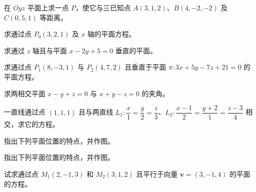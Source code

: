\noindent\begin{minipage}{\textwidth}
在 $Oyz$ 平面上求一点 $P$，使它与三已知点 $A(3,1,2)$、$B(4,-2,-2)$ 及 $C(0,5,1)$ 等距离。
\end{minipage}\par\vfill
\newpage
\noindent\begin{minipage}{\textwidth}
求通过点 $P_0(3,2,1)$ 及 $x$ 轴的平面方程。
\end{minipage}\par\vfill
\noindent\begin{minipage}{\textwidth}
求通过 $z$ 轴且与平面 $x-2y+5=0$ 垂直的平面。
\end{minipage}\par\vfill
\noindent\begin{minipage}{\textwidth}
求通过点 $P_1(8,-3,1)$ 与 $P_2(4,7,2)$ 且垂直于平面 $\pi:3x+5y-7z+21=0$ 的平面方程。
\end{minipage}\par\vfill
\noindent\begin{minipage}{\textwidth}
求两相交平面 $x-y+z=0$ 与 $x+y-z=0$ 的夹角。
\end{minipage}\par\vfill
\newpage
\noindent\begin{minipage}{\textwidth}
一直线通过点 $(1,1,1)$ 且与两直线 $L_1:\dfrac{x}{1}=\dfrac{y}{2}=\dfrac{z}{3}$、$L_2:\dfrac{x-1}{2}=\dfrac{y+2}{1}=\dfrac{z-3}{4}$ 相交，求它的方程。
\end{minipage}\par\vfill
\noindent\begin{minipage}{\textwidth}
指出下列平面位置的特点，并作图。
\end{minipage}\par\vfill
\noindent\begin{minipage}{\textwidth}
指出下列平面位置的特点，并作图。
\end{minipage}\par\vfill
\noindent\begin{minipage}{\textwidth}
试求通过点 $M_1(2,-1,3)$ 和 $M_2(3,1,2)$ 且平行于向量 $\boldsymbol v=(3,-1,4)$ 的平面的方程。
\end{minipage}\par\vfill
